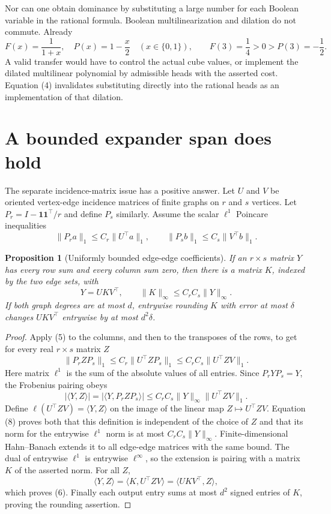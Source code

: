 \documentclass[11pt]{article}
\newtheorem{proposition}{Proposition}
\begin{document}
Nor can one obtain dominance by substituting a large number for each
Boolean variable in the rational formula. Boolean multilinearization
and dilation do not commute. Already
\[
 F(x)=\frac1{1+x},\quad
 P(x)=1-\frac{x}{2}\quad(x\in\{0,1\}),\qquad
 F(3)=\frac14>0>P(3)=-\frac12.
 \tag{4}
\]
A valid transfer would have to control the actual cube values, or
implement the dilated multilinear polynomial by admissible heads with
the asserted cost. Equation (4) invalidates substituting directly into
the rational heads as an implementation of that dilation.

\section*{A bounded expander span does hold}
The separate incidence-matrix issue has a positive answer. Let $U$ and
$V$ be oriented vertex-edge incidence matrices of finite graphs on
$r$ and $s$ vertices. Let $P_r=I-\mathbf1\mathbf1^\top/r$ and define
$P_s$ similarly. Assume the scalar $\ell^1$ Poincare inequalities
\[
 \|P_r a\|_1\le C_r\|U^\top a\|_1,
 \qquad
 \|P_s b\|_1\le C_s\|V^\top b\|_1.
 \tag{5}
\]

\begin{proposition}[Uniformly bounded edge-edge coefficients]
If an $r\times s$ matrix $Y$ has every row sum and every column sum
zero, then there is a matrix $K$, indexed by the two edge sets, with
\[
 Y=UKV^\top,\qquad
 \|K\|_\infty\le C_rC_s\|Y\|_\infty.
 \tag{6}
\]
If both graph degrees are at most $d$, entrywise rounding $K$ with
error at most $\delta$ changes $UKV^\top$ entrywise by at most
$d^2\delta$.
\end{proposition}
\begin{proof}
Apply (5) to the columns, and then to the transposes of the rows, to get
for every real $r\times s$ matrix $Z$
\[
 \|P_r ZP_s\|_1
 \le C_r\|U^\top ZP_s\|_1
 \le C_rC_s\|U^\top ZV\|_1.
 \tag{7}
\]
Here matrix $\ell^1$ is the sum of the absolute values of all entries.
Since $P_rYP_s=Y$, the Frobenius pairing obeys
\[
 |\langle Y,Z\rangle|
 =|\langle Y,P_rZP_s\rangle|
 \le C_rC_s\|Y\|_\infty\|U^\top ZV\|_1.
 \tag{8}
\]
Define $\ell(U^\top ZV)=\langle Y,Z\rangle$ on the image of the
linear map $Z\mapsto U^\top ZV$. Equation (8) proves both that this
definition is independent of the choice of $Z$ and that its norm
for the entrywise $\ell^1$ norm is at most
$C_rC_s\|Y\|_\infty$. Finite-dimensional Hahn--Banach extends it
to all edge-edge matrices with the same bound. The dual of entrywise
$\ell^1$ is entrywise $\ell^\infty$, so the extension is pairing
with a matrix $K$ of the asserted norm. For all $Z$,
\[
 \langle Y,Z\rangle=\langle K,U^\top ZV\rangle
                  =\langle UKV^\top,Z\rangle,
\]
which proves (6). Finally each output entry sums at most $d^2$
signed entries of $K$, proving the rounding assertion.
\end{proof}
\end{document}
